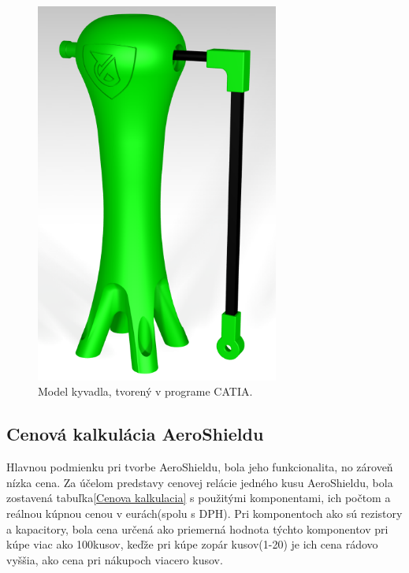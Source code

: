 \begin{figure}
	\centering
	\includegraphics[width=80mm]{obr/AeroCatiaa.png}
	\caption{Model kyvadla, tvorený v programe CATIA.}\label{OBRAZOK 1.1}
\end{figure}

\subsection{Cenová kalkulácia AeroShieldu}

Hlavnou podmienku pri tvorbe AeroShieldu, bola jeho funkcionalita, no zároveň nízka cena. Za účelom predstavy cenovej relácie jedného kusu AeroShieldu, bola zostavená tabuľka\ref{Cenova kalkulacia} s použitými komponentami, ich počtom a reálnou kúpnou cenou v eurách(spolu s DPH). Pri komponentoch ako sú rezistory a kapacitory, bola cena určená ako priemerná hodnota týchto komponentov pri kúpe viac ako 100kusov, keďže pri kúpe zopár kusov(1-20) je ich cena rádovo vyššia, ako cena pri nákupoch viacero kusov. 

